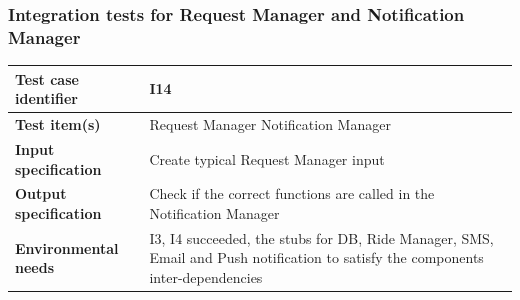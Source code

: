 \documentclass[a4paper,11pt]{report} %
\begin{document}
		\subsubsection{Integration tests for Request Manager and Notification Manager} \label{sec:3.1.11}
			\begin{minipage}{\linewidth}
			\end{minipage}		
		\begin{center}
			\renewcommand{\arraystretch}{1.2}
			\setlength{\tabcolsep}{24pt}
			\begin{tabular}{ l  p{9cm}}\hline
				\textbf{Test case identifier} & I14\\\hline
				\textbf{Test item(s)} & Request Manager \textrightarrow Notification Manager\\\hline
				\textbf{Input specification} & Create typical Request Manager input \\\hline
				\textbf{Output specification} & Check if the correct functions are called in the Notification Manager\\\hline
				\textbf{Environmental needs} &  I3, I4 succeeded, the stubs for DB, Ride Manager, SMS, Email and Push notification to satisfy the components inter-dependencies\\\hline
			\end{tabular}
		\end{center}	
		
\end{document}
